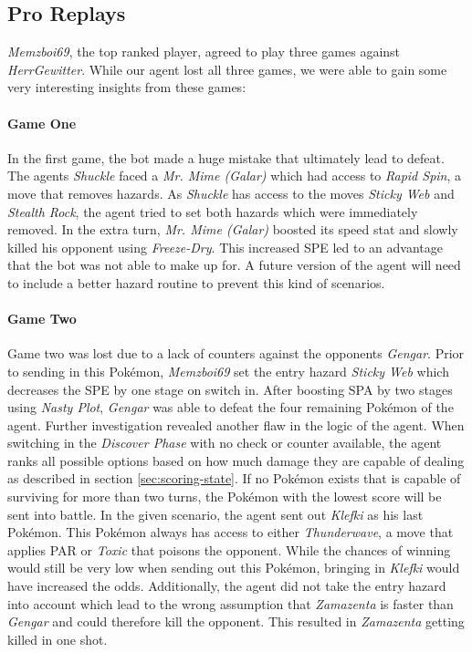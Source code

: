 \subsection{Pro Replays}
\textit{Memzboi69}, the top ranked player, agreed to play three games against \textit{HerrGewitter}. 
While our agent lost all three 
games, we were able to gain some very interesting insights from these games:

\paragraph{Game One}
In the first game, the bot made a huge mistake that ultimately lead to defeat. The agents \textit{Shuckle} faced a 
\textit{Mr. Mime (Galar)} which had access to \textit{Rapid Spin}, a move that removes hazards. As \textit{Shuckle}
has access to the moves \textit{Sticky Web} and \textit{Stealth Rock}, the agent tried to set both hazards
which were immediately removed. In the extra turn, \textit{Mr. Mime (Galar)} boosted its speed stat and slowly
killed his opponent using \textit{Freeze-Dry}. This increased \ac{SPE} led to an advantage that the bot was
not able to make up for. A future version of the agent will need to include a better hazard routine to prevent
this kind of scenarios.  

\paragraph{Game Two}
Game two was lost due to a lack of counters against the opponents \textit{Gengar}. Prior to sending in this Pokémon,
\textit{Memzboi69} set the entry hazard \textit{Sticky Web} which decreases the \ac{SPE} by one stage on switch in.
After boosting \ac{SPA} by two stages using \textit{Nasty Plot}, \textit{Gengar} was able to defeat the four 
remaining Pokémon of the agent. Further investigation revealed another flaw in the logic of the agent. When switching
in the \textit{Discover Phase} with no check or counter available, the agent ranks all possible options based on how 
much damage they are capable of dealing as described in section \ref{sec:scoring-state}.
If no Pokémon exists that is capable of surviving for more than two turns, the Pokémon with the lowest score will
be sent into battle. In the given scenario, the agent sent out \textit{Klefki} as his last Pokémon. This Pokémon
always has access to either \textit{Thunderwave}, a move that applies \ac{PAR} or \textit{Toxic} that poisons the
opponent. While the chances of winning would still be very low when sending out this Pokémon, bringing in \textit{Klefki}
would have increased the odds. Additionally, the agent did not take the entry hazard into account which lead to
the wrong assumption that \textit{Zamazenta} is faster than \textit{Gengar} and could therefore kill the opponent.
This resulted in \textit{Zamazenta} getting killed in one shot.

